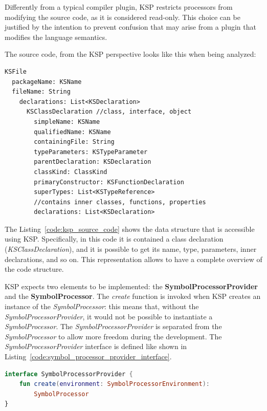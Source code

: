 Differently from a typical compiler plugin, KSP restricts processors from modifying the source code, as it is considered read-only. This choice can be justified by the intention to prevent confusion that may arise from a plugin that modifies the language semantics.

The source code, from the KSP perspective looks like this when being analyzed:
\begin{lstlisting}[caption={The source code from KSP perspective}, captionpos=b, label={code:ksp_source_code}]
KSFile
  packageName: KSName
  fileName: String
    declarations: List<KSDeclaration>
      KSClassDeclaration //class, interface, object
        simpleName: KSName
        qualifiedName: KSName
        containingFile: String
        typeParameters: KSTypeParameter
        parentDeclaration: KSDeclaration
        classKind: ClassKind
        primaryConstructor: KSFunctionDeclaration
        superTypes: List<KSTypeReference>
        //contains inner classes, functions, properties
        declarations: List<KSDeclaration>    
\end{lstlisting}
The Listing~\ref{code:ksp_source_code} shows the data structure that is accessible using KSP. Specifically, in this code it is contained a class declaration (\textit{KSClassDeclaration}), and it is possible to get its name, type, parameters, inner declarations, and so on.\newline
This representation allows to have a complete overview of the code structure.

KSP expects two elements to be implemented: the \textbf{SymbolProcessorProvider} and the \textbf{SymbolProcessor}.\newline
The \textit{create} function is invoked when KSP creates an instance of the \textit{SymbolProcessor}: this means that, without the \textit{SymbolProcessorProvider}, it would not be possible to instantiate a \textit{SymbolProcessor}. The \textit{SymbolProcessorProvider} is separated from the \textit{SymbolProcessor} to allow more freedom during the development.
The \textit{SymbolProcessorProvider} interface is defined like shown in Listing~\ref{code:symbol_processor_provider_interface}.
\begin{lstlisting}[caption={SymbolProcessorProvider interface}, language=Kotlin, captionpos=b, label={code:symbol_processor_provider_interface}]
interface SymbolProcessorProvider {
    fun create(environment: SymbolProcessorEnvironment):
        SymbolProcessor
}
\end{lstlisting}

